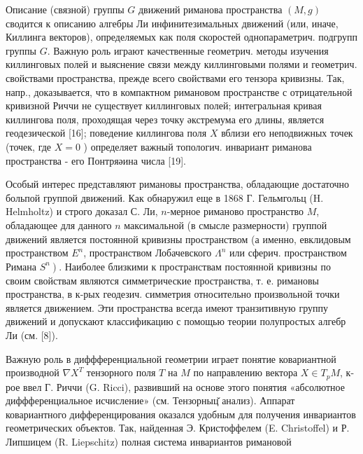 \documentclass[10pt]{article}
\begin{document}
Описание (связной) группы $G$ движений риманова пространства $(M, g)$ сводится к описанию алгебры Ли инфинитезимальных движений (или, иначе, Киллинга векторов), определяемых как поля скоростей однопараметрич. подгрупп группы $G$. Важную роль играют качественные геометрич. методы изучения киллинговых полей и выяснение связи между киллинговыми полями и геометрич. свойствами пространства, прежде всего свойствами его тензора кривизны. Так, напр., доказывается, что в компактном римановом пространстве с отрицательной кривизной Риччи не существует киллинговых полей; интегральная кривая киллингова поля, проходящая через точку әкстремума его длины, является геодезической [16]; поведение киллингова поля $X$ вблизи его неподвижных точек (точек, где $X=0$ ) определяет важный топологич. инвариант риманова пространства - его Понтряәина числа [19].



Особый интерес представляют римановы пространства, обладающие достаточно больпой группой движений. Как обнаружил еще в 1868 Г. Гельмгольц (H. Helmholtz) и строго доказал С. Ли, $n$-мерное риманово пространство $M$, обладающее для данного $n$ максимальной (в смысле размерности) группой движений является постоянной кривизны пространством (а именно, евклидовым пространством $E^{n}$, пространством Лобачевского $\Lambda^{n}$ или сферич. пространством Римана $\left.S^{n}\right)$. Наиболее близкими к пространствам постоянной кривизны по своим свойствам являются симметрические пространства, т. е. римановы пространства, в к-рых геодезич. симметрия относительно произвольной точки является движением. Эти пространства всегда имеют транзитивную группу движений и допускают классификацию с помощью теории полупростых алгебр Ли (см. [8]).



Важную роль в диффференциальной геометрии играет понятие ковариантной производной $\nabla X^{T}$ тензорного поля $T$ на $M$ по направлению вектора $X \in T_{p} M$, к-рое ввел Г. Риччи (G. Ricci), развивший на основе этого понятия «абсолютное диффференциальное исчисление» (см. Тензорныц̆ анализ). Аппарат ковариантного дифференцирования оказался удобным для получения инвариантов геометрических объектов. Так, найденная Э. Кристоффелем (E. Christoffel) и Р. Липшицем (R. Liepschitz) полная система инвариантов римановой
\end{document}
